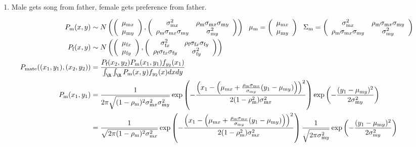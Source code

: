 \documentclass{article}\usepackage[]{graphicx}\usepackage[]{color}
\newcommand{\x}[1]{\text{#1}}
\begin{document}
\begin{landscape}
\begin{align*}
\end{align*}
\begin{enumerate}
\item Male gets song from father, female gets preference from father.
\end{enumerate}

\begin{align*}
P_\x{m}(x,y)&\sim N\left(\left(\begin{array}{cc} \mu_{\x{m}x} \\ \mu_{\x{m}y}  \end{array}\right),\left(\begin{array}{cccc}\sigma_{\x{m}x}^2 & \rho_\x{m}\sigma_{\x{m}x}\sigma_{\x{m}y} \\  \rho_\x{m}\sigma_{\x{m}x}\sigma_{\x{m}y} & \sigma_{\x{m}y}^2\end{array}\right)\right) \ \ \mu_\x{m} = \left(\begin{array}{cc} \mu_{\x{m}x} \\ \mu_{\x{m}y}  \end{array}\right) \ \ \Sigma_\x{m} = \left(\begin{array}{cccc}\sigma_{\x{m}x}^2 & \rho_\x{m}\sigma_{\x{m}x}\sigma_{\x{m}y} \\  \rho_\x{m}\sigma_{\x{m}x}\sigma_{\x{m}y} & \sigma_{\x{m}y}^2\end{array}\right)
\\P_\x{f}(x,y)&\sim N\left(\left(\begin{array}{cc} \mu_{\x{f}x} \\ \mu_{\x{f}y}  \end{array}\right),\left(\begin{array}{cccc}\sigma_{\x{f}x}^2 & \rho_\x{f}\sigma_{\x{f}x}\sigma_{\x{f}y} \\  \rho_\x{f}\sigma_{\x{f}x}\sigma_{\x{f}y} & \sigma_{\x{f}y}^2\end{array}\right)\right)
\\ P_\x{mate}((x_1,y_1),(x_2,y_2))&=\frac{P_\x{f}(x_2,y_2)P_\x{m}(x_1,y_1)f_{y_2}(x_1)}{\int_\R\int_\R P_\x{m}(x,y)f_{y_2}(x)dxdy}
\\ P_\x{m}(x_1,y_1)&=\frac{1}{2\pi\sqrt{(1-\rho_\x{m})^2\sigma_{\x{m}x}^2\sigma_{\x{m}y}^2}}\exp\left(-\frac{\left(x_1-\left(\mu_{\x{m}x}+\frac{\rho_\x{m}\sigma_{\x{m}x}}{\sigma_{\x{m}y}}(y_1-\mu_{\x{m}y})\right)\right)^2}{2(1-\rho_\x{m}^2)\sigma_{\x{m}x}^2}\right)\exp\left(-\frac{(y_1-\mu_{\x{m}y})^2}{2\sigma_{\x{m}y}^2}\right)
\\&=\frac{1}{\sqrt{2\pi(1-\rho_\x{m})^2\sigma_{\x{m}x}^2}}\exp\left(-\frac{\left(x_1-\left(\mu_{\x{m}x}+\frac{\rho_\x{m}\sigma_{\x{m}x}}{\sigma_{\x{m}y}}(y_1-\mu_{\x{m}y})\right)\right)^2}{2(1-\rho_\x{m}^2)\sigma_{\x{m}x}^2}\right)\frac{1}{\sqrt{2\pi\sigma_{\x{m}y}^2}}\exp\left(-\frac{(y_1-\mu_{\x{m}y})^2}{2\sigma_{\x{m}y}^2}\right)

\end{align*}
\end{landscape}
\end{document}

